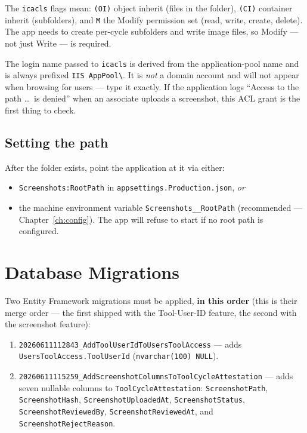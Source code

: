 \documentclass[12pt,a4paper]{report}
\begin{document}
\begin{notebox}
The \texttt{icacls} flags mean: \texttt{(OI)} object inherit (files in the folder),
\texttt{(CI)} container inherit (subfolders), and \texttt{M} the Modify permission set
(read, write, create, delete). The app needs to create per-cycle subfolders and write image files,
so Modify --- not just Write --- is required.
\end{notebox}

\begin{warnbox}
The login name passed to \texttt{icacls} is derived from the application-pool name and is always
prefixed \texttt{IIS AppPool\textbackslash}. It is \emph{not} a domain account and will not appear
when browsing for users --- type it exactly. If the application logs ``Access to the path
\ldots\ is denied'' when an associate uploads a screenshot, this ACL grant is the first thing to
check.
\end{warnbox}

\section{Setting the path}

After the folder exists, point the application at it via either:

\begin{itemize}
  \item \texttt{Screenshots:RootPath} in \texttt{appsettings.Production.json}, \emph{or}
  \item the machine environment variable \texttt{Screenshots\_\_RootPath} (recommended ---
        Chapter~\ref{ch:config}). The app will refuse to start if no root path is configured.
\end{itemize}

\chapter{Database Migrations}
\label{ch:migrations}

Two Entity Framework migrations must be applied, \textbf{in this order} (this is their merge order ---
the first shipped with the Tool-User-ID feature, the second with the screenshot feature):

\begin{enumerate}
  \item \texttt{20260611112843\_AddToolUserIdToUsersToolAccess} --- adds
        \texttt{UsersToolAccess.ToolUserId} (\texttt{nvarchar(100) NULL}).
  \item \texttt{20260611115259\_AddScreenshotColumnsToToolCycleAttestation} --- adds seven nullable
        columns to \texttt{ToolCycleAttestation}: \texttt{ScreenshotPath}, \texttt{ScreenshotHash},
        \texttt{ScreenshotUploadedAt}, \texttt{ScreenshotStatus}, \texttt{ScreenshotReviewedBy},
        \texttt{ScreenshotReviewedAt}, and \texttt{ScreenshotRejectReason}.
\end{enumerate}
\end{document}

